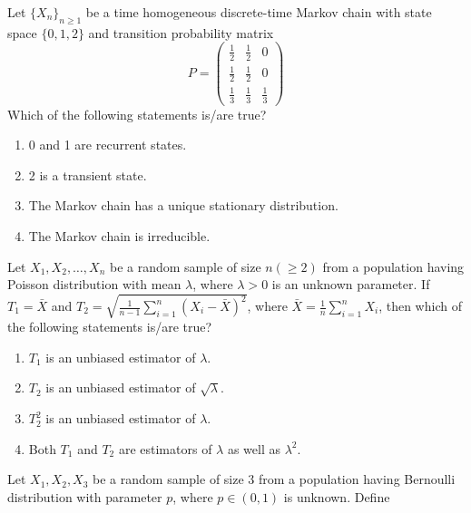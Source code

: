 \iffalse


\chapter{2024}
\author{EE24BTECH11023}
\section{st}
\fi
    \item Let $\{X_n\}_{n \geq 1}$ be a time homogeneous discrete-time Markov chain with state space $\{0, 1, 2\}$ and transition probability matrix
\[
    P = \begin{pmatrix} 
        \frac{1}{2} & \frac{1}{2} & 0 \\ 
        \frac{1}{2} & \frac{1}{2} & 0 \\ 
        \frac{1}{3} & \frac{1}{3} & \frac{1}{3} 
    \end{pmatrix}
\]
    Which of the following statements is/are true?
    \begin{enumerate}
        \item 0 and 1 are recurrent states.
        \item 2 is a transient state.
        \item The Markov chain has a unique stationary distribution.
        \item The Markov chain is irreducible.
    \end{enumerate}
    \item Let $X_1, X_2, \dots, X_n$ be a random sample of size $n (\geq 2)$ from a population having Poisson distribution with mean $\lambda$, where $\lambda > 0$ is an unknown parameter. If $T_1 = \bar{X}$ and $T_2 = \sqrt{\frac{1}{n-1} \sum_{i=1}^{n} (X_i - \bar{X})^2}$, where $\bar{X} = \frac{1}{n} \sum_{i=1}^{n} X_i$, then which of the following statements is/are true?
    \begin{enumerate}
        \item $T_1$ is an unbiased estimator of $\lambda$.
        \item $T_2$ is an unbiased estimator of $\sqrt{\lambda}$.
        \item $T_2^2$ is an unbiased estimator of $\lambda$.
        \item Both $T_1$ and $T_2$ are estimators of $\lambda$ as well as $\lambda^2$.
    \end{enumerate}
    \item Let $X_1, X_2, X_3$ be a random sample of size 3 from a population having Bernoulli distribution with parameter $p$, where $p \in (0,1)$ is unknown. Define
